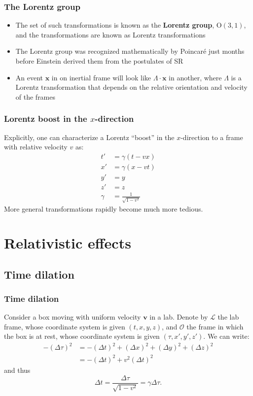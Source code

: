 \documentclass{beamer}
\begin{document}
\begin{frame}
    \frametitle{The Lorentz group}
    \begin{itemize}
        \item The set of such transformations is known as the \textbf{Lorentz group}, $\text{O}(3,1)$,
            and the transformations are known as Lorentz transformations
        \item The Lorentz group was recognized mathematically by Poincar\'e just months before Einstein
            derived them from the postulates of SR
        \item An event $\mathbf{x}$ in on inertial frame will look like $\Lambda\cdot \mathbf{x}$ in another,
            where $\Lambda$ is a Lorentz transformation that depends on the relative orientation and velocity
            of the frames
    \end{itemize}
\end{frame}

\begin{frame}
    \frametitle{Lorentz boost in the $x$-direction}
    Explicitly, one can characterize a Lorentz ``boost'' in the $x$-direction to a frame with relative velocity $v$ as:
    \begin{align*}
        t'&=\gamma(t-vx)\\
        x'&=\gamma(x-vt)\\
        y'&=y\\
        z'&=z\\
        \gamma&=\frac{1}{\sqrt{1-v^2}}
    \end{align*}
    More general transformations rapidly become much more tedious.
\end{frame}

\section{Relativistic effects}
\subsection{Time dilation}

\begin{frame}
    \frametitle{Time dilation}
    Consider a box moving with uniform velocity $\mathbf{v}$ in a lab. Denote by $\mathcal{L}$ the lab frame,
    whose coordinate system is given $(t,x,y,z)$, and $\mathcal{O}$ the frame in which the box is at rest, whose
    coordinate system is given $(\tau,x',y',z')$. We can write:
    \begin{align*}
        -(\Delta \tau)^2&=-(\Delta t)^2+(\Delta x)^2+(\Delta y)^2+(\Delta z)^2\\
        &=-(\Delta t)^2+v^2(\Delta t)^2
    \end{align*}
    and thus
    \[\Delta t=\frac{\Delta \tau}{\sqrt{1-v^2}}=\gamma\Delta \tau.\]
\end{frame}
\end{document}
